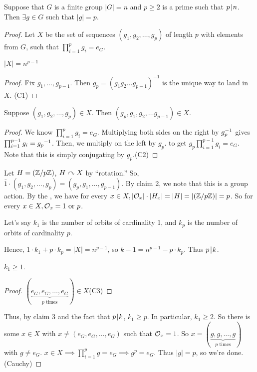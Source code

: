 \documentclass[notes.tex]{subfile}
\begin{document}
\begin{theorem}[Cauchy]
	\label{cauchy}
	Suppose that $G$ is a finite group $|G|=n$ and $p\ge 2$ is a prime such that $p\mkern2mu|\mkern1mu n$. Then $\exists g\in G$ such that $|g| = p$.	
\end{theorem}
\begin{proof}
	Let $X$ be the set of sequences $(g_1, g_2, \ldots, g_p)$ of length $p$ with elements from $G$, such that $\prod_{i=1}^pg_i = e_G$.
	\begin{claim}[1]
		$|X|=n^{p-1}$
	\end{claim}
	\begin{proof}
		Fix $g_1, \ldots, g_{p-1}$. Then $g_p = (g_1g_2\ldots g_{p-1})^{-1}$ is the unique way to land in $X$. \qedhere(C1)
	\end{proof}
	\begin{claim}[2]
		Suppose $(g_1, g_2, \ldots, g_p)\in X$. Then $(g_p, g_1, g_2, \ldots g_{p-1}) \in X$.
	\end{claim}
	\begin{proof}
		We know $\prod_{i=1}^pg_i = e_G$. Multiplying both sides on the right by ${g}^{-1}_p$ gives $\prod_{i=1}^{p-1}g_i = {g_p}^{-1}$. Then, we multiply on the left by $g_p$. to get $g_p\prod_{i=1}^{p-1}g_i = e_G$. Note that this is simply conjugating by $g_p$.\qedhere(C2)
	\end{proof}
	Let $H=(\mathbb{Z}/{p}\mathbb{Z})$, $H \curvearrowright X$ by ``rotation.'' So, $\bar 1 \cdot(g_1, g_2, \ldots, g_p) = (g_p, g_1, \ldots, g_{p-1})$. By claim 2, we note that this is a group action. By the  , we have for every $x\in X, |\mathcal{O}_x|\cdot|H_x| = |H| = |(\mathbb{Z}/{p}\mathbb{Z})| = p$. So for every $x\in X, \mathcal{O}_x = 1 \text{ or }p$.

	Let's say $k_1$ is the number of orbits of cardinality 1, and $k_p$ is the number of orbits of cardinality $p$.

	Hence, $1\cdot k_1 + p\cdot k_p = |X| = n^{p-1}$, so $k-1 = n^{p-1} - p\cdot k_p$. Thus $p\mkern2mu|\mkern1mu k$.
	\begin{claim}[3]
		$k_1 \ge 1$.
	\end{claim}
	\begin{proof}
		$(\underbrace{e_G, e_G, \ldots, e_G}_{p \text{ times}}) \in X$\qedhere(C3)
	\end{proof}
	Thus, by claim 3 and the fact that $p\mkern2mu|\mkern1mu k$, $k_1\ge p$. In particular, $k_1\ge 2$. So there is some $x\in X$ with $x\ne(e_G, e_G, \ldots, e_G)$ such that $\mathcal{O}_x=1$. So $x=(\underbrace{g, g, \ldots, g}_{p \text{ times}})$ with $g\ne e_G$. 
	$x\in X \implies \prod_{i=1}^p g = e_G \implies g^p = e_G$. Thus $|g| = p$, so we're done.\qedhere(Cauchy)
\end{proof}
\end{document}
